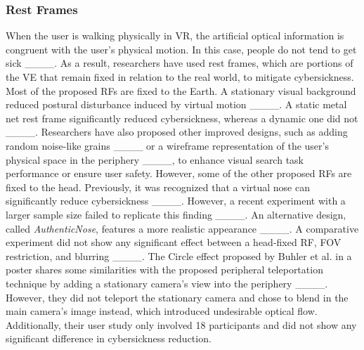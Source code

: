 \subsubsection{Rest Frames}
When the user is walking physically in VR, the artificial optical information is congruent with the user's physical motion.
In this case, people do not tend to get sick ____. 
As a result, researchers have used rest frames, which are portions of the VE that remain fixed in relation to the real world, to mitigate cybersickness.
Most of the proposed RFs are fixed to the Earth.
A stationary visual background reduced postural disturbance induced by virtual motion ____. A static metal net rest frame significantly reduced cybersickness, whereas a dynamic one did not ____. Researchers have also proposed other improved designs, such as adding random noise-like grains ____ or a wireframe representation of the user's physical space in the periphery ____, to enhance visual search task performance or ensure user safety.
However, some of the other proposed RFs are fixed to the head.
Previously, it was recognized that a virtual nose can significantly reduce cybersickness ____. However, a recent experiment with a larger sample size failed to replicate this finding ____. An alternative design, called \textit{AuthenticNose}, features a more realistic appearance ____. A comparative experiment did not show any significant effect between a head-fixed RF, FOV restriction, and blurring ____.
The Circle effect proposed by Buhler et al. in a poster shares some similarities with the proposed peripheral teleportation technique by adding a stationary camera's view into the periphery ____.
However, they did not teleport the stationary camera and chose to blend in the main camera's image instead, which introduced undesirable optical flow.
Additionally, their user study only involved 18 participants and did not show any significant difference in cybersickness reduction.



